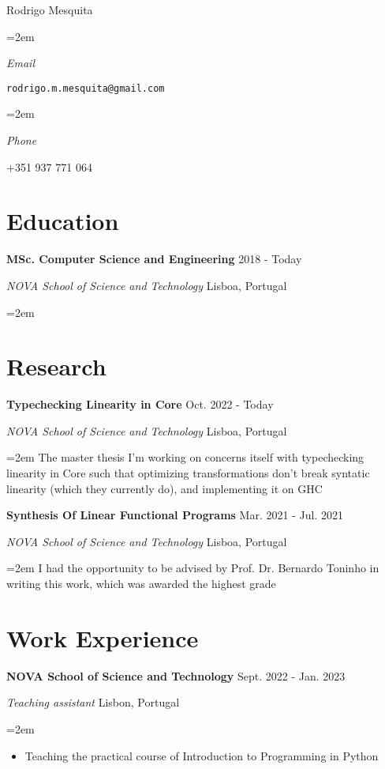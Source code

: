 \documentclass{article}
\newlength{\spacebox}
\newcommand{\name}[1]{\huge#1\normalsize\par\vspace*{0.5em}}
\newcommand{\info}[2]{
  \noindent\hangindent=2em\hangafter=0
  \parbox{\spacebox}{%
  \textsl{#1}} %
  #2 \par} %
\newcommand{\sientry}[4]{
  \noindent  \textbf{#1}
    \hfill \small #3 \normalsize \par
  \noindent \textit{#2}
    \hfill \small #4 \normalsize \par
}
\newcommand{\entry}[5]{
  \sientry{#1}{#2}{#3}{#4}
     \noindent\hangindent=2em\hangafter=0 \small #5
\normalsize \par
}
\begin{document}
\name{Rodrigo Mesquita}
\info{Email}{\texttt{rodrigo.m.mesquita@gmail.com}}
\info{Phone}{+351 937 771 064}


\section*{Education}

  \entry
    {MSc. Computer Science and Engineering}
    {NOVA School of Science and Technology}
    {2018 - Today}
    {Lisboa, Portugal}
    {}

\section*{Research}

  \entry
    {Typechecking Linearity in Core}
    {NOVA School of Science and Technology}
    {Oct. 2022 - Today}
    {Lisboa, Portugal}
    {The master thesis I'm working on concerns itself with typechecking
    linearity in Core such that optimizing transformations don't break syntatic
    linearity (which they currently do), and implementing it on GHC}

  \entry
    {Synthesis Of Linear Functional Programs}
    {NOVA School of Science and Technology}
    {Mar. 2021 - Jul. 2021}
    {Lisboa, Portugal}
    {I had the opportunity to be advised by Prof. Dr. Bernardo Toninho in
    writing this work, which was awarded the highest grade}

\section*{Work Experience}

  \entry
    {NOVA School of Science and Technology}
    {Teaching assistant}
    {Sept. 2022 - Jan. 2023}
    {Lisbon, Portugal}
    {
      \begin{itemize}
          \item {Teaching the practical course of Introduction to Programming in Python}
      \end{itemize}
    }
\end{document}
